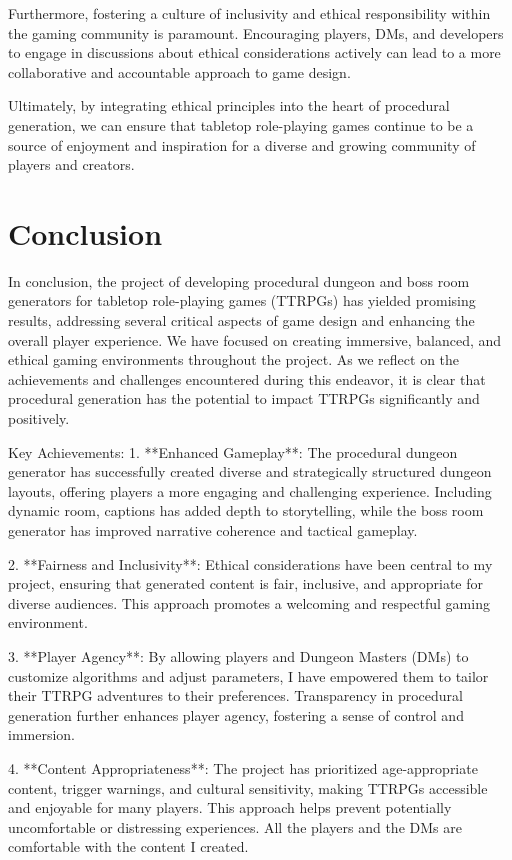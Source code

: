 \documentclass[10pt,twocolumn]{article}
\begin{document}
Furthermore, fostering a culture of inclusivity and ethical responsibility within the gaming community is paramount. Encouraging players, DMs, and developers to engage in discussions about ethical considerations actively can lead to a more collaborative and accountable approach to game design.

Ultimately, by integrating ethical principles into the heart of procedural generation, we can ensure that tabletop role-playing games continue to be a source of enjoyment and inspiration for a diverse and growing community of players and creators.
\section{Conclusion}

In conclusion, the project of developing procedural dungeon and boss room generators for tabletop role-playing games (TTRPGs) has yielded promising results, addressing several critical aspects of game design and enhancing the overall player experience. We have focused on creating immersive, balanced, and ethical gaming environments throughout the project. As we reflect on the achievements and challenges encountered during this endeavor, it is clear that procedural generation has the potential to impact TTRPGs significantly and positively.

Key Achievements:
1. **Enhanced Gameplay**: The procedural dungeon generator has successfully created diverse and strategically structured dungeon layouts, offering players a more engaging and challenging experience. Including dynamic room, captions has added depth to storytelling, while the boss room generator has improved narrative coherence and tactical gameplay.

2. **Fairness and Inclusivity**: Ethical considerations have been central to my project, ensuring that generated content is fair, inclusive, and appropriate for diverse audiences. This approach promotes a welcoming and respectful gaming environment.

3. **Player Agency**: By allowing players and Dungeon Masters (DMs) to customize algorithms and adjust parameters, I have empowered them to tailor their TTRPG adventures to their preferences. Transparency in procedural generation further enhances player agency, fostering a sense of control and immersion.

4. **Content Appropriateness**: The project has prioritized age-appropriate content, trigger warnings, and cultural sensitivity, making TTRPGs accessible and enjoyable for many players. This approach helps prevent potentially uncomfortable or distressing experiences. All the players and the DMs are comfortable with the content I created.
\end{document}
